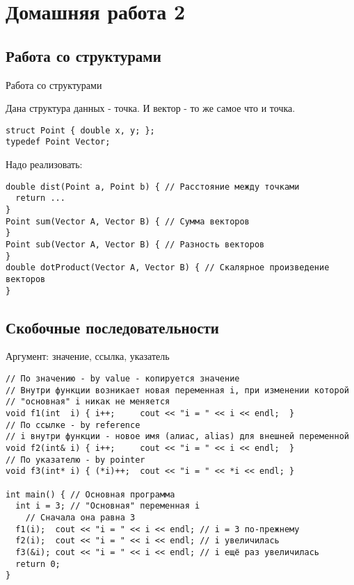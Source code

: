 \section{Домашняя работа 2}

\subsection{Работа со структурами}

\begin{frame}[t,fragile]{Работа со структурами}

Дана структура данных - точка. И вектор - то же самое что и точка.
\begin{lstlisting}
struct Point { double x, y; };
typedef Point Vector;
\end{lstlisting}

Надо реализовать:
\begin{lstlisting}
double dist(Point a, Point b) { // Расстояние между точками
  return ... 
}
Point sum(Vector A, Vector B) { // Сумма векторов
}
Point sub(Vector A, Vector B) { // Разность векторов
}
double dotProduct(Vector A, Vector B) { // Скалярное произведение векторов
}
\end{lstlisting}
\end{frame}

\subsection{Скобочные последовательности}

\begin{frame}[t,fragile]{Аргумент: значение, ссылка, указатель}
\begin{lstlisting}
// По значению - by value - копируется значение
// Внутри функции возникает новая переменная i, при изменении которой
// "основная" i никак не меняется
void f1(int  i) { i++;     cout << "i = " << i << endl;  }
// По ссылке - by reference
// i внутри функции - новое имя (алиас, alias) для внешней переменной
void f2(int& i) { i++;     cout << "i = " << i << endl;  }
// По указателю - by pointer
void f3(int* i) { (*i)++;  cout << "i = " << *i << endl; }

int main() { // Основная программа
  int i = 3; // "Основная" переменная i
    // Сначала она равна 3
  f1(i);  cout << "i = " << i << endl; // i = 3 по-прежнему
  f2(i);  cout << "i = " << i << endl; // i увеличилась
  f3(&i); cout << "i = " << i << endl; // i ещё раз увеличилась
  return 0;
}
\end{lstlisting}
\end{frame}

